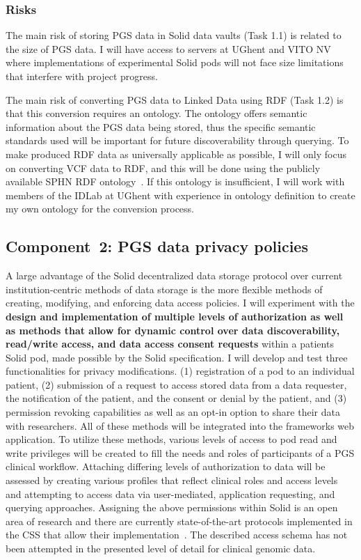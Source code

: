 \documentclass[a4paper,11pt]{article}
\begin{document}
\begin{refsection}
\subsubsection{Risks}
The main risk of storing PGS data in Solid data vaults (Task 1.1) is related to the size of PGS data. 
I will have access to servers at UGhent and VITO NV where implementations of experimental Solid pods will not face size limitations that interfere with project progress.

The main risk of converting PGS data to Linked Data using RDF (Task 1.2) is that this conversion requires an ontology. 
The ontology offers semantic information about the PGS data being stored, thus the specific semantic standards used will be important for future discoverability through querying. 
To make produced RDF data as universally applicable as possible, I will only focus on converting VCF data to RDF, and this will be done using the publicly available SPHN RDF ontology~\cite{sphn_rdf_2023}.
If this ontology is insufficient, I will work with members of the IDLab at UGhent with experience in ontology definition to create my own ontology for the conversion process.


\newcommand\WPb{PGS data privacy policies}
\subsection{Component~2: \WPb}

A large advantage of the Solid decentralized data storage protocol over current institution-centric methods of data storage is the more flexible methods of creating, modifying, and enforcing data access policies. 
I will experiment with the \textbf{design and implementation of multiple levels of authorization as well as methods that allow for dynamic control over data discoverability, read/write access, and data access consent requests} within a patient\textquotesingle s Solid pod, made possible by the Solid specification. 
I will develop and test three functionalities for privacy modifications.
(1) registration of a pod to an individual patient,
(2) submission of a request to access stored data from a data requester, the notification of the patient, and the consent or denial by the patient, and
(3) permission revoking capabilities as well as an opt-in option to share their data with researchers. 
All of these methods will be integrated into the framework\textquotesingle s web application.
To utilize these methods, various levels of access to pod read and write privileges will be created to fill the needs and roles of participants of a PGS clinical workflow. 
Attaching differing levels of authorization to data will be assessed by creating various profiles that reflect clinical roles and access levels and attempting to access data via user-mediated, application requesting, and querying approaches. 
Assigning the above permissions within Solid is an open area of research and there are currently state-of-the-art protocols implemented in the CSS that allow their implementation~\cite{css}.
The described access schema has not been attempted in the presented level of detail for clinical genomic data.


\end{refsection}
\end{document}
